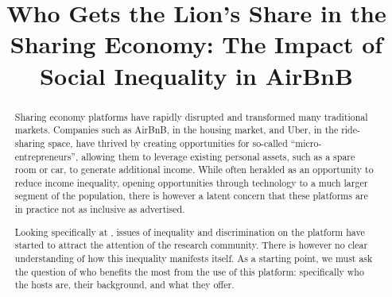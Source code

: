 \documentclass[format=acmsmall, review=false, screen=true]{acmart}
\begin{document}
\title[The Impact of Social Inequality in AirBnB]{Who Gets the Lion's Share in the Sharing Economy: The Impact of Social Inequality in AirBnB}


\begin{abstract}
Sharing economy platforms have rapidly disrupted and transformed many traditional markets. Companies such as AirBnB, in the housing market, and Uber, in the ride-sharing space, have thrived by creating opportunities for so-called ``micro-entrepreneurs'', allowing them to leverage existing personal assets, such as a spare room or car, to generate additional income. While often heralded as an opportunity to reduce income inequality, opening opportunities through technology to a much larger segment of the population, there is however a latent concern that these platforms are in practice not as inclusive as advertised.

Looking specifically at \ab, issues of inequality and discrimination on the platform have started to attract the attention of the research community. There is however no clear understanding of how this inequality manifests itself. As a starting point, we must ask the question of who benefits the most from the use of this platform: specifically who the hosts are, their background, and what they offer.

%
\end{abstract}
%
\end{document}
